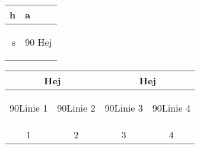 \documentclass{article}
\newcommand{\rot}[1]{\begin{turn}{90}#1\end{turn}}
\begin{document}
\begin{tabular}{r|l}
h & a \\
\hline
s & 
\begin{turn}{90}
Hej
\end{turn}
\end{tabular}

\vspace{2cm}

\begin{tabular}{c|c|c|c}
\hline
\multicolumn{2}{c}{Hej} & \multicolumn{2}{|c}{Hej} \\
\hline
\rot{Linie 1} & 
\rot{Linie 2} & 
\rot{Linie 3} & 
\rot{Linie 4\phantom{g}}  \\
\hline
1 & 2 & 3 & 4
\end{tabular}
\end{document}
